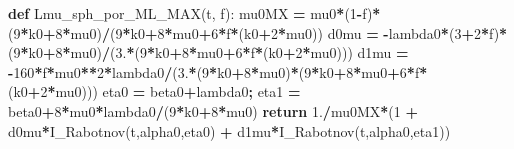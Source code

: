 \documentclass[
  a4paper,
  numbers=noendperiod,
  DIV=12]{scrreprt}
\newenvironment{Shaded}{\begin{snugshade}}{\end{snugshade}}
\newcommand{\ControlFlowTok}[1]{\textcolor[rgb]{0.13,0.29,0.53}{\textbf{#1}}}
\newcommand{\DecValTok}[1]{\textcolor[rgb]{0.00,0.00,0.81}{#1}}
\newcommand{\FloatTok}[1]{\textcolor[rgb]{0.00,0.00,0.81}{#1}}
\newcommand{\KeywordTok}[1]{\textcolor[rgb]{0.13,0.29,0.53}{\textbf{#1}}}
\newcommand{\NormalTok}[1]{#1}
\newcommand{\OperatorTok}[1]{\textcolor[rgb]{0.81,0.36,0.00}{\textbf{#1}}}
\begin{document}
\begin{Shaded}
\begin{Highlighting}[]
\KeywordTok{def}\NormalTok{ Lmu\_sph\_por\_ML\_MAX(t, f):}
\NormalTok{    mu0MX }\OperatorTok{=}\NormalTok{ mu0}\OperatorTok{*}\NormalTok{(}\DecValTok{1}\OperatorTok{{-}}\NormalTok{f)}\OperatorTok{*}\NormalTok{(}\DecValTok{9}\OperatorTok{*}\NormalTok{k0}\OperatorTok{+}\DecValTok{8}\OperatorTok{*}\NormalTok{mu0)}\OperatorTok{/}\NormalTok{(}\DecValTok{9}\OperatorTok{*}\NormalTok{k0}\OperatorTok{+}\DecValTok{8}\OperatorTok{*}\NormalTok{mu0}\OperatorTok{+}\DecValTok{6}\OperatorTok{*}\NormalTok{f}\OperatorTok{*}\NormalTok{(k0}\OperatorTok{+}\DecValTok{2}\OperatorTok{*}\NormalTok{mu0))}
\NormalTok{    d0mu  }\OperatorTok{=} \OperatorTok{{-}}\NormalTok{lambda0}\OperatorTok{*}\NormalTok{(}\DecValTok{3}\OperatorTok{+}\DecValTok{2}\OperatorTok{*}\NormalTok{f)}\OperatorTok{*}\NormalTok{(}\DecValTok{9}\OperatorTok{*}\NormalTok{k0}\OperatorTok{+}\DecValTok{8}\OperatorTok{*}\NormalTok{mu0)}\OperatorTok{/}\NormalTok{(}\FloatTok{3.}\OperatorTok{*}\NormalTok{(}\DecValTok{9}\OperatorTok{*}\NormalTok{k0}\OperatorTok{+}\DecValTok{8}\OperatorTok{*}\NormalTok{mu0}\OperatorTok{+}\DecValTok{6}\OperatorTok{*}\NormalTok{f}\OperatorTok{*}\NormalTok{(k0}\OperatorTok{+}\DecValTok{2}\OperatorTok{*}\NormalTok{mu0)))}
\NormalTok{    d1mu  }\OperatorTok{=} \OperatorTok{{-}}\DecValTok{160}\OperatorTok{*}\NormalTok{f}\OperatorTok{*}\NormalTok{mu0}\OperatorTok{**}\DecValTok{2}\OperatorTok{*}\NormalTok{lambda0}\OperatorTok{/}\NormalTok{(}\FloatTok{3.}\OperatorTok{*}\NormalTok{(}\DecValTok{9}\OperatorTok{*}\NormalTok{k0}\OperatorTok{+}\DecValTok{8}\OperatorTok{*}\NormalTok{mu0)}\OperatorTok{*}\NormalTok{(}\DecValTok{9}\OperatorTok{*}\NormalTok{k0}\OperatorTok{+}\DecValTok{8}\OperatorTok{*}\NormalTok{mu0}\OperatorTok{+}\DecValTok{6}\OperatorTok{*}\NormalTok{f}\OperatorTok{*}\NormalTok{(k0}\OperatorTok{+}\DecValTok{2}\OperatorTok{*}\NormalTok{mu0)))}
\NormalTok{    eta0 }\OperatorTok{=}\NormalTok{ beta0}\OperatorTok{+}\NormalTok{lambda0}\OperatorTok{;}\NormalTok{  eta1 }\OperatorTok{=}\NormalTok{ beta0}\OperatorTok{+}\DecValTok{8}\OperatorTok{*}\NormalTok{mu0}\OperatorTok{*}\NormalTok{lambda0}\OperatorTok{/}\NormalTok{(}\DecValTok{9}\OperatorTok{*}\NormalTok{k0}\OperatorTok{+}\DecValTok{8}\OperatorTok{*}\NormalTok{mu0)}
    \ControlFlowTok{return} \FloatTok{1.}\OperatorTok{/}\NormalTok{mu0MX}\OperatorTok{*}\NormalTok{(}\DecValTok{1} \OperatorTok{+}\NormalTok{ d0mu}\OperatorTok{*}\NormalTok{I\_Rabotnov(t,alpha0,eta0) }\OperatorTok{+}\NormalTok{ d1mu}\OperatorTok{*}\NormalTok{I\_Rabotnov(t,alpha0,eta1))}


\end{Highlighting}
\end{Shaded}
\end{document}
